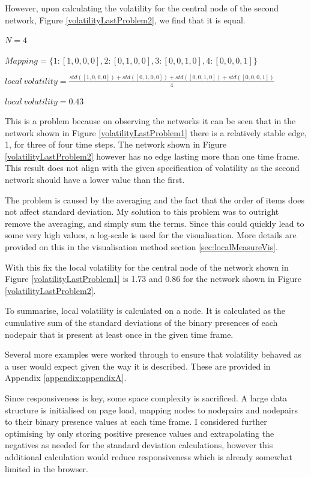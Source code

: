 However, upon calculating the volatility for the central node of the second network, Figure \ref{volatilityLastProblem2}, we find that it is equal. 

\begin{center}
$N = 4$

$Mapping = \{1:[1, 0, 0, 0], 2:[0, 1, 0, 0], 3: [0, 0, 1, 0], 4: [0, 0, 0, 1]\}$

$local\ volatility = \frac{std([1,0,0,0]) + std([0,1,0,0]) + std([0,0,1,0]) + std([0,0,0,1])}{4}$

$local\ volatility = 0.43$
\end{center}

This is a problem because on observing the networks it can be seen that in the network shown in Figure \ref{volatilityLastProblem1} there is a relatively stable edge, 1, for three of four time steps. The network shown in Figure \ref{volatilityLastProblem2} however has no edge lasting more than one time frame. This result does not align with the given specification of volatility as the second network should have a lower value than the first.

The problem is caused by the averaging and the fact that the order of items does not affect standard deviation. My solution to this problem was to outright remove the averaging, and simply sum the terms. Since this could quickly lead to some very high values, a log-scale is used for the visualisation. More details are provided on this in the visualisation method section \ref{sec:localMeasureVis}.  

With this fix the local volatility for the central node of the network shown in Figure \ref{volatilityLastProblem1} is 1.73 and 0.86 for the network shown in Figure \ref{volatilityLastProblem2}. 

To summarise, local volatility is calculated on a node. It is calculated as the cumulative sum of the standard deviations of the binary presences of each nodepair that is present at least once in the given time frame.

Several more examples were worked through to ensure that volatility behaved as a user would expect given the way it is described. These are provided in Appendix \ref{appendix:appendixA}.

Since responsiveness is key, some space complexity is sacrificed. A large data structure is initialised on page load, mapping nodes to nodepairs and nodepairs to their binary presence values at each time frame.
I considered further optimising by only storing positive presence values and extrapolating the negatives as needed for the standard deviation calculations, however this additional calculation would reduce responsiveness which is already somewhat limited in the browser.


